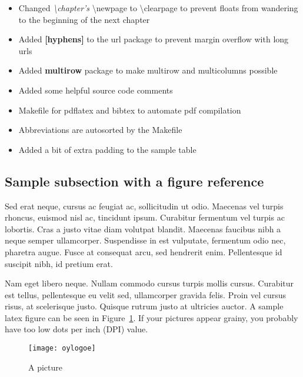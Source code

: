 \begin{itemize}
\item Changed \textit{\textbackslash{chapter's}} \textbackslash{newpage} to 
\textbackslash{clearpage} to prevent floats from wandering to the beginning of the next chapter

\item Added \textbf{[hyphens]} to the url package to prevent margin overflow with 
long urls

\item Added \textbf{multirow} package to make multirow and multicolumns possible

\item Added some helpful source code comments

\item Makefile for pdflatex and bibtex to automate pdf compilation

\item Abbreviations are autosorted by the Makefile

\item Added a bit of extra padding to the sample table
\end{itemize}

\subsection{Sample subsection with a figure reference}

Sed erat neque, cursus ac feugiat ac, sollicitudin
ut odio. Maecenas vel turpis rhoncus, euismod nisl ac, tincidunt ipsum. Curabitur fermentum vel
turpis ac lobortis. Cras a justo vitae diam volutpat blandit. Maecenas faucibus nibh a neque 
semper ullamcorper. Suspendisse in est vulputate, fermentum odio nec, pharetra augue. Fusce at
consequat arcu, sed hendrerit enim. Pellentesque id suscipit nibh, id pretium erat. 

Nam eget libero neque. Nullam commodo cursus turpis mollis cursus. Curabitur est tellus,
pellentesque eu velit sed, ullamcorper gravida felis. Proin vel cursus risus, at scelerisque 
justo. Quisque rutrum justo at ultricies auctor. A sample latex figure can be seen in
Figure~\ref{fig:oylogoe}. If your pictures appear grainy, you probably have too low dots
per inch (DPI) value.


\begin{figure}[ht]
  \begin{center}
    \texttt{[image: oylogoe]}
  \end{center}
  \caption{A picture}
  \label{fig:oylogoe}
\end{figure}

